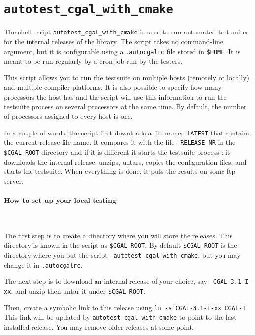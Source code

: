 
\section{{\tt autotest\_cgal\_with\_cmake}}
\label{sec:autotest_cgal_with_cmake}

The shell script {\tt autotest\_cgal\_with\_cmake} is used to run automated test suites for
the internal releases of the library. The script takes no command-line
argument, but it is configurable using a {\tt .autocgalrc} file stored
in {\tt \$HOME}.
It is meant to be run regularly by a cron job run by the testers.

This script allows you to run the testsuite on multiple hosts (remotely or
locally) and multiple compiler-platforms. It is also possible to specify how
many processors the host has and the script will use this information to run
the testsuite process on several processors at the same time. By default, the
number of processors assigned to every host is one.

In a couple of words, the script first downloads a file named {\tt LATEST}
that contains the current release file name. It compares it with the file {\tt
RELEASE\_NR} in the {\tt \$CGAL\_ROOT} directory and if it is different it
starts the testsuite process : it downloads the internal release, unzips,
untars, copies the configuration files, and starts the testsuite. When
everything is done, it puts the results on some ftp server.

\paragraph{How to set up your local testing} ~

The first step is to create a directory where you will store the releases.
This directory is known in the script as {\tt \$CGAL\_ROOT}. By default
{\tt \$CGAL\_ROOT} is the directory where you put the script {\tt
autotest\_cgal\_with\_cmake}, but you may change it in {\tt .autocgalrc}.

The next step is to download an internal release of your choice, say {\tt
CGAL-3.1-I-xx}, and unzip then untar it under {\tt \$CGAL\_ROOT}.

Then, create a symbolic link to this release using {\tt ln -s CGAL-3.1-I-xx
CGAL-I}. This link will be updated by {\tt autotest\_cgal\_with\_cmake} to point to the
last installed release.  You may remove older releases at some point.

